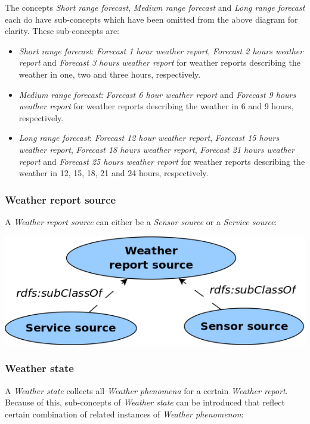 The concepts \emph{Short range forecast}, \emph{Medium range forecast} and \emph{Long range forecast} each do have sub-concepts which have been omitted from the above diagram for clarity. These sub-concepts are:
\begin{itemize}
  \item \emph{Short range forecast}: \emph{Forecast 1 hour weather report}, \emph{Forecast 2 hours weather report} and \emph{Forecast 3 hours weather report} for weather reports describing the weather in one, two and three hours, respectively.
  \item \emph{Medium range forecast}: \emph{Forecast 6 hour weather report} and \emph{Forecast 9 hours weather report} for weather reports describing the weather in 6 and 9 hours, respectively.
  \item \emph{Long range forecast}: \emph{Forecast 12 hour weather report}, \emph{Forecast 15 hours weather report}, \emph{Forecast 18 hours weather report}, \emph{Forecast 21 hours weather report} and \emph{Forecast 25 hours weather report} for weather reports describing the weather in 12, 15, 18, 21 and 24 hours, respectively.
\end{itemize}

\subsubsection{Weather report source}

A \emph{Weather report source} can either be a \emph{Sensor source} or a \emph{Service source}:

\begin{center}
  \includegraphics[width=.5\textwidth]{figures/diagrams/weather-report-source.png}
\end{center}

\subsubsection{Weather state}

A \emph{Weather state} collects all \emph{Weather phenomena} for a certain \emph{Weather report}. Because of this, sub-concepts of \emph{Weather state} can be introduced that reflect certain combination of related instances of \emph{Weather phenomenon}:

